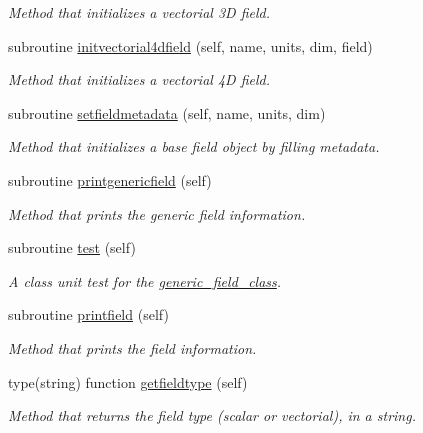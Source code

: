 \begin{DoxyCompactItemize}
\begin{DoxyCompactList}\small\item\em Method that initializes a vectorial 3D field. \end{DoxyCompactList}\item 
subroutine \mbox{\hyperlink{namespacefield__types__mod_ada2cd66d3baca6f614b2dfb477fc9b3b}{initvectorial4dfield}} (self, name, units, dim, field)
\begin{DoxyCompactList}\small\item\em Method that initializes a vectorial 4D field. \end{DoxyCompactList}\item 
subroutine \mbox{\hyperlink{namespacefield__types__mod_af6090a0e4ff4834c37af5f33d35fa03d}{setfieldmetadata}} (self, name, units, dim)
\begin{DoxyCompactList}\small\item\em Method that initializes a base field object by filling metadata. \end{DoxyCompactList}\item 
subroutine \mbox{\hyperlink{namespacefield__types__mod_a9b7f13b8dea24ec75f1a017a943a3fb5}{printgenericfield}} (self)
\begin{DoxyCompactList}\small\item\em Method that prints the generic field information. \end{DoxyCompactList}\item 
subroutine \mbox{\hyperlink{namespacefield__types__mod_ad1448b34724138b4adf0d0abda0bb012}{test}} (self)
\begin{DoxyCompactList}\small\item\em A class \textquotesingle{}unit\textquotesingle{} test for the \mbox{\hyperlink{structfield__types__mod_1_1generic__field__class}{generic\+\_\+field\+\_\+class}}. \end{DoxyCompactList}\item 
subroutine \mbox{\hyperlink{namespacefield__types__mod_aaf5716bf674e6caa4d8a9f3a14a5b393}{printfield}} (self)
\begin{DoxyCompactList}\small\item\em Method that prints the field information. \end{DoxyCompactList}\item 
type(string) function \mbox{\hyperlink{namespacefield__types__mod_aef22f053fd727cf82be4386d65b47031}{getfieldtype}} (self)
\begin{DoxyCompactList}\small\item\em Method that returns the field type (scalar or vectorial), in a string. \end{DoxyCompactList}\end{DoxyCompactItemize}


